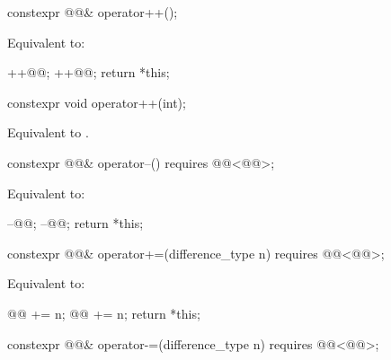 %
\begin{itemdecl}
constexpr @@& operator++();
\end{itemdecl}

\begin{itemdescr}
\pnum
\effects
Equivalent to:
\begin{codeblock}
++@@;
++@@;
return *this;
\end{codeblock}
\end{itemdescr}

%
\begin{itemdecl}
constexpr void operator++(int);
\end{itemdecl}

\begin{itemdescr}
\pnum
\effects
Equivalent to .
\end{itemdescr}

%
\begin{itemdecl}
constexpr @@& operator--() requires @@<@@>;
\end{itemdecl}

\begin{itemdescr}
\pnum
\effects
Equivalent to:
\begin{codeblock}
--@@;
--@@;
return *this;
\end{codeblock}
\end{itemdescr}

%
\begin{itemdecl}
constexpr @@& operator+=(difference_type n)
  requires @@<@@>;
\end{itemdecl}

\begin{itemdescr}
\pnum
\effects
Equivalent to:
\begin{codeblock}
@@ += n;
@@ += n;
return *this;
\end{codeblock}
\end{itemdescr}

%
\begin{itemdecl}
constexpr @@& operator-=(difference_type n)
  requires @@<@@>;
\end{itemdecl}

